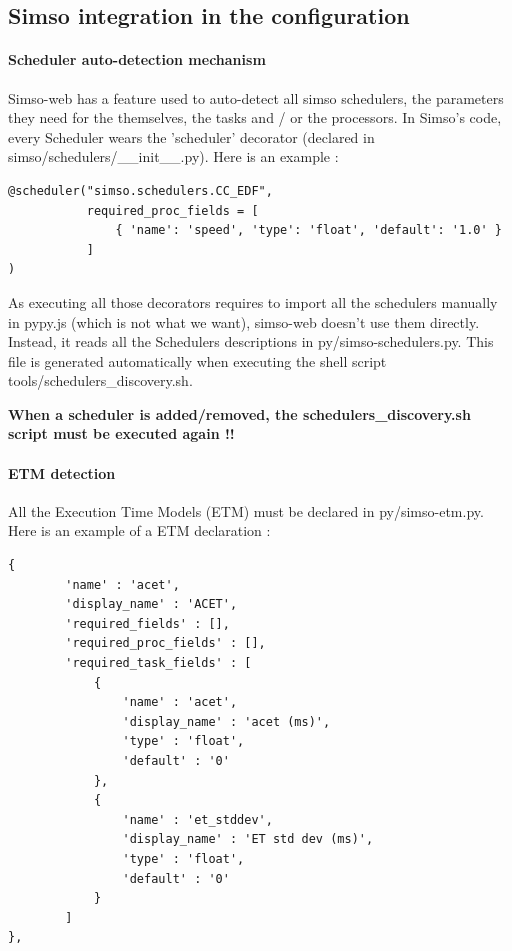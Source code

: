 \documentclass[10pt,a4paper]{article}
\begin{document}
\subsection{Simso integration in the configuration}

\paragraph{Scheduler auto-detection mechanism}
Simso-web has a feature used to auto-detect all simso schedulers, the parameters they need for the themselves, the tasks and / or the processors. In Simso's code, every Scheduler wears the 'scheduler' decorator (declared in simso/schedulers/\_\_init\_\_.py).
Here is an example :
\lstset{language=python}
\begin{lstlisting}
@scheduler("simso.schedulers.CC_EDF",
           required_proc_fields = [
               { 'name': 'speed', 'type': 'float', 'default': '1.0' }
           ]
)
\end{lstlisting}

As executing all those decorators requires to import all the schedulers manually in pypy.js (which is not what we want), simso-web doesn't use them directly. Instead, it reads all the Schedulers descriptions in py/simso-schedulers.py. This file is generated automatically when executing the shell script tools/schedulers\_discovery.sh.

\textbf{When a scheduler is added/removed, the schedulers\_discovery.sh script must be executed again !!}

\paragraph{ETM detection}
All the Execution Time Models (ETM) must be declared in py/simso-etm.py. Here is an example of a ETM declaration :
\lstset{language=python}
\begin{lstlisting}
{
		'name' : 'acet',
		'display_name' : 'ACET',
		'required_fields' : [],
		'required_proc_fields' : [],
		'required_task_fields' : [
			{
				'name' : 'acet',
				'display_name' : 'acet (ms)',
				'type' : 'float',
				'default' : '0'
			},
			{
				'name' : 'et_stddev',
				'display_name' : 'ET std dev (ms)',
				'type' : 'float',
				'default' : '0'
			}
		]
},
\end{lstlisting}
\end{document}
